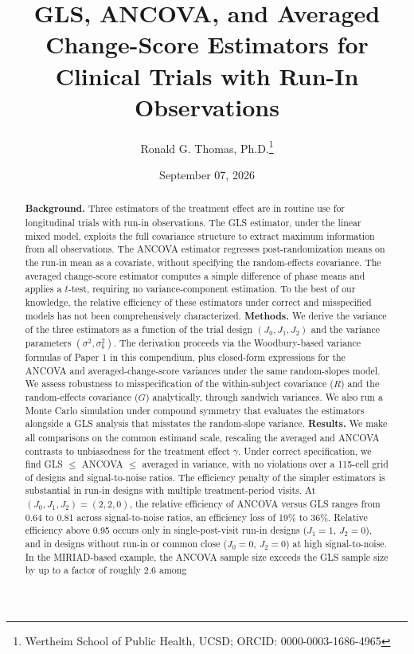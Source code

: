 \documentclass[
  11pt,
]{article}
\title{GLS, ANCOVA, and Averaged Change-Score Estimators for
Clinical Trials with Run-In Observations}
\author{Ronald G. Thomas, Ph.D.\thanks{Wertheim School of Public Health, UCSD; ORCID: 0000-0003-1686-4965}}
\date{September 07, 2026}
\begin{document}
\maketitle
\begin{abstract}
\textbf{Background.} Three estimators of the treatment effect
are in routine use for longitudinal trials with run-in
observations. The GLS estimator, under the linear mixed
model, exploits the full covariance structure to extract
maximum information from all observations. The ANCOVA
estimator regresses post-randomization means on the run-in
mean as a covariate, without specifying the random-effects
covariance. The averaged change-score estimator computes a
simple difference of phase means and applies a \(t\)-test,
requiring no variance-component estimation. To the best of
our knowledge, the relative efficiency of these estimators
under correct and misspecified models has not been
comprehensively characterized.
\textbf{Methods.} We derive the variance of the three
estimators as a function of the trial design
\((J_0, J_1, J_2)\) and the variance parameters
\((\sigma^2, \sigma_b^2)\). The derivation proceeds via the
Woodbury-based variance formulas of Paper 1 in this
compendium, plus closed-form expressions for the ANCOVA
and averaged-change-score variances under the same
random-slopes model. We assess robustness to
misspecification of the within-subject covariance (\(R\))
and the random-effects covariance (\(G\)) analytically,
through sandwich variances. We also run a Monte Carlo
simulation under compound symmetry that evaluates the
estimators alongside a GLS analysis that misstates the
random-slope variance.
\textbf{Results.} We make all comparisons on the common
estimand scale, rescaling the averaged and ANCOVA
contrasts to unbiasedness for the treatment effect
\(\gamma\). Under correct specification, we find GLS
\(\le\) ANCOVA \(\le\) averaged in variance, with no
violations over a 115-cell grid of designs and
signal-to-noise ratios. The efficiency penalty of the
simpler estimators is substantial in run-in designs with
multiple treatment-period visits. At
\((J_0, J_1, J_2) = (2, 2, 0)\), the relative efficiency of
ANCOVA versus GLS ranges from 0.64 to 0.81 across
signal-to-noise ratios, an efficiency loss of 19\% to
36\%. Relative efficiency above 0.95 occurs only in
single-post-visit run-in designs (\(J_1 = 1\), \(J_2 = 0\)),
and in designs without run-in or common close
(\(J_0 = 0\), \(J_2 = 0\)) at high signal-to-noise. In the
MIRIAD-based example, the ANCOVA sample size exceeds the
GLS sample size by up to a factor of roughly 2.6 among

\end{abstract}
\end{document}
